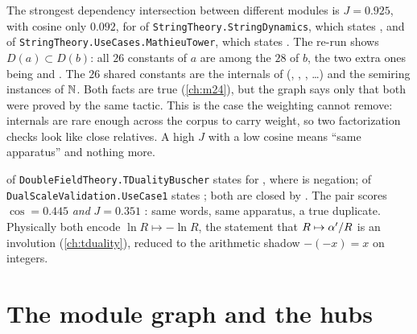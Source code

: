 \begin{example}\label{ex:atlas:m24}
The strongest dependency intersection between different modules is $J=0.925$, with
cosine only $0.092$, for  of \texttt{StringTheory.StringDynamics}, which
states , and
 of \texttt{StringTheory.UseCases.MathieuTower}, which
states  . The
re-run shows $D(a)\subset D(b)$: all $26$ constants of $a$ are among the $28$ of $b$, the
two extra ones being  and . The $26$ shared constants are the
internals of  (, ,
, \dots) and the semiring instances of $\mathbb{N}$. Both facts are true
(\cref{ch:m24}), but the graph says only that both were proved by the same tactic. This
is the case the weighting cannot remove:  internals are rare enough
across the corpus to carry weight, so two factorization checks look like close relatives.
A high $J$ with a low cosine means ``same apparatus'' and nothing more.
\end{example}

\begin{example}\label{ex:atlas:dup}
 of \texttt{DoubleFieldTheory.TDualityBuscher} states
 for , where 
is negation;  of \texttt{DualScaleValidation.UseCase1}
states ; both are closed by . The pair scores $\cos=0.445$
\emph{and} $J=0.351$ : same words, same apparatus, a true
duplicate. Physically both encode $\ln R\mapsto-\ln R$, the statement that
$R\mapsto\alpha'/R$ is an involution (\cref{ch:tduality}), reduced to the arithmetic shadow
$-(-x)=x$ on integers.
\end{example}

\section{The module graph and the hubs}\label{sec:atlas:hubs}


